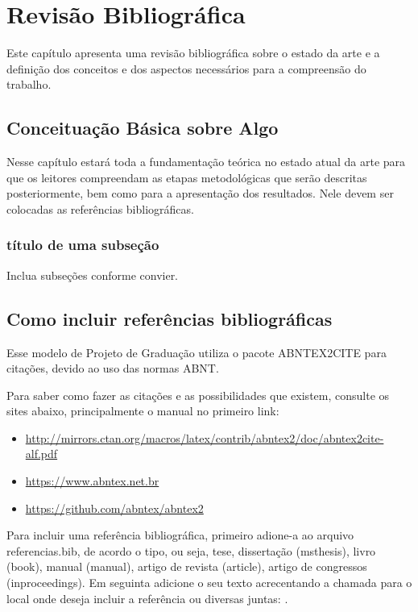 \chapter{Revisão Bibliográfica}

Este capítulo apresenta uma revisão bibliográfica sobre o estado da arte e a definição dos conceitos e dos aspectos necessários para a compreensão do trabalho.

\section{Conceituação Básica sobre Algo}

Nesse capítulo estará toda a fundamentação teórica no estado atual da arte para que os leitores compreendam as etapas metodológicas que serão descritas posteriormente, bem como para a apresentação dos resultados. Nele devem ser colocadas as referências bibliográficas.  

\subsection{título de uma subseção}

Inclua subseções conforme convier.

\section{Como incluir referências bibliográficas}

Esse modelo de Projeto de Graduação utiliza o pacote ABNTEX2CITE para citações, devido ao uso das normas ABNT.

Para saber como fazer as citações e as possibilidades que existem, consulte os sites abaixo, principalmente o manual no primeiro link:
\begin{itemize}
\item \textcolor{red}{\href{http://mirrors.ctan.org/macros/latex/contrib/abntex2/doc/abntex2cite-alf.pdf}{http://mirrors.ctan.org/macros/latex/contrib/abntex2/doc/abntex2cite-alf.pdf}}
    \item \href{https://www.abntex.net.br}{https://www.abntex.net.br}
    \item \href{https://github.com/abntex/abntex2}{https://github.com/abntex/abntex2}
\end{itemize}

Para incluir uma referência bibliográfica, primeiro adione-a ao arquivo referencias.bib, de acordo o tipo, ou seja, tese, dissertação (msthesis), livro (book), manual (manual), artigo de revista (article), artigo de congressos (inproceedings). Em seguinta adicione o seu texto acrecentando a chamada para o local onde deseja incluir a referência \cite{OMS2011} ou diversas juntas: \cite{NBR12859,who2018}.



